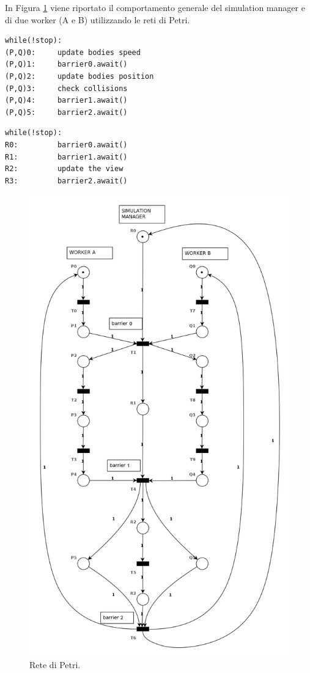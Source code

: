 \documentclass[12pt,a4paper,openright,twoside]{book}
\begin{document}
In Figura \ref{fig:petri-net} viene riportato il comportamento generale del simulation manager e di due worker (A e B) utilizzando 
le reti di Petri.
\begin{lstlisting}[label=lst:worker,caption=Pseudocodice del worker]
		while(!stop):
(P,Q)0:		update bodies speed
(P,Q)1:		barrier0.await()
(P,Q)2:		update bodies position
(P,Q)3:		check collisions
(P,Q)4:		barrier1.await()
(P,Q)5:		barrier2.await()
\end{lstlisting}

\begin{lstlisting}[label=lst:simulation_manager,caption=Pseudocodice del simulation manager]
		while(!stop):
R0:			barrier0.await()
R1:			barrier1.await()
R2:			update the view
R3:			barrier2.await()
\end{lstlisting}

\begin{figure}
	\centering
	\includegraphics[width=0.9\linewidth]{figures/petri-net.png}
	\caption{Rete di Petri.}
	\label{fig:petri-net}
\end{figure}
\end{document}
